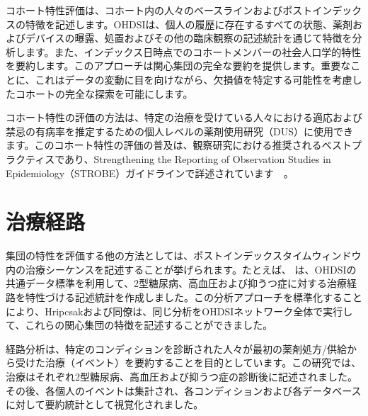 \documentclass[
  11pt]{book}
\theoremstyle{definition}
\theoremstyle{definition}
\theoremstyle{definition}
\theoremstyle{definition}
\theoremstyle{remark}
\begin{document}
コホート特性評価は、コホート内の人々のベースラインおよびポストインデックスの特徴を記述します。OHDSIは、個人の履歴に存在するすべての状態、薬剤およびデバイスの曝露、処置およびその他の臨床観察の記述統計を通じて特徴を分析します。また、インデックス日時点でのコホートメンバーの社会人口学的特性を要約します。このアプローチは関心集団の完全な要約を提供します。重要なことに、これはデータの変動に目を向けながら、欠損値を特定する可能性を考慮したコホートの完全な探索を可能にします。

コホート特性の評価の方法は、特定の治療を受けている人々における適応および禁忌の有病率を推定するための個人レベルの薬剤使用研究（DUS）に使用できます。このコホート特性の評価の普及は、観察研究における推奨されるベストプラクティスであり、Strengthening the Reporting of Observation Studies in Epidemiology（STROBE）ガイドラインで詳述されています　\citep{VONELM2008344}。  

\section{治療経路}\label{ux6cbbux7642ux7d4cux8def}

集団の特性を評価する他の方法としては、ポストインデックスタイムウィンドウ内の治療シーケンスを記述することが挙げられます。たとえば、\citet{Hripcsak7329} は、OHDSIの共通データ標準を利用して、2型糖尿病、高血圧および抑うつ症に対する治療経路を特性づける記述統計を作成しました。この分析アプローチを標準化することにより、Hripcsakおよび同僚は、同じ分析をOHDSIネットワーク全体で実行して、これらの関心集団の特徴を記述することができました。   

経路分析は、特定のコンディションを診断された人々が最初の薬剤処方/供給から受けた治療（イベント）を要約することを目的としています。この研究では、治療はそれぞれ2型糖尿病、高血圧および抑うつ症の診断後に記述されました。その後、各個人のイベントは集計され、各コンディションおよび各データベースに対して要約統計として視覚化されました。
\end{document}
